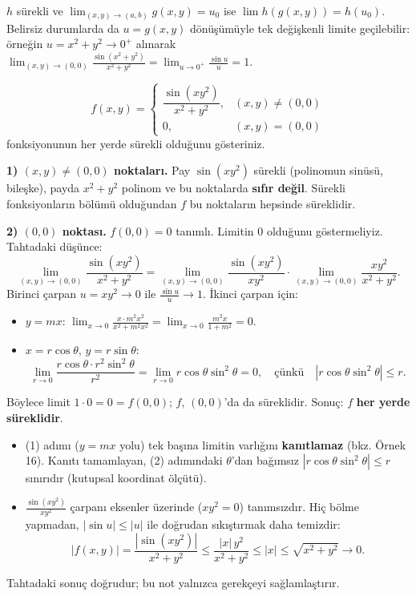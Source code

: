 \begin{bilgi}
$h$ sürekli ve $\lim_{(x,y)\to(a,b)}g(x,y)=u_0$ ise $\lim h(g(x,y))=h(u_0)$. Belirsiz durumlarda da $u=g(x,y)$
dönüşümüyle tek değişkenli limite geçilebilir: örneğin $u=x^2+y^2\to0^+$ alınarak
$\displaystyle\lim_{(x,y)\to(0,0)}\frac{\sin(x^2+y^2)}{x^2+y^2}=\lim_{u\to0^+}\frac{\sin u}{u}=1$.
\end{bilgi}

\begin{soru}
\[
f(x,y)=\begin{cases}\dfrac{\sin(xy^2)}{x^2+y^2}, & (x,y)\neq(0,0)\\[6pt] 0, & (x,y)=(0,0)\end{cases}
\]
fonksiyonunun her yerde sürekli olduğunu gösteriniz.
\end{soru}
\begin{cevap}
\textbf{1) $(x,y)\neq(0,0)$ noktaları.} Pay $\sin(xy^2)$ sürekli (polinomun sinüsü, bileşke), payda $x^2+y^2$ polinom
ve bu noktalarda \textbf{sıfır değil}. Sürekli fonksiyonların bölümü olduğundan $f$ bu noktaların hepsinde süreklidir.

\textbf{2) $(0,0)$ noktası.} $f(0,0)=0$ tanımlı. Limitin $0$ olduğunu göstermeliyiz. Tahtadaki düşünce:
\[
\lim_{(x,y)\to(0,0)}\frac{\sin(xy^2)}{x^2+y^2}=\lim_{(x,y)\to(0,0)}\frac{\sin(xy^2)}{xy^2}\cdot
\lim_{(x,y)\to(0,0)}\frac{xy^2}{x^2+y^2}.
\]
Birinci çarpan $u=xy^2\to0$ ile $\frac{\sin u}{u}\to1$. İkinci çarpan için:
\begin{itemize}
  \item[(1)] $y=mx$: $\displaystyle\lim_{x\to0}\frac{x\cdot m^2x^2}{x^2+m^2x^2}=\lim_{x\to0}\frac{m^2x}{1+m^2}=0$.
  \item[(2)] $x=r\cos\theta$, $y=r\sin\theta$:
  \[
  \lim_{r\to0}\frac{r\cos\theta\cdot r^2\sin^2\theta}{r^2}=\lim_{r\to0}r\cos\theta\sin^2\theta=0,
  \quad\text{çünkü}\quad \boxed{|r\cos\theta\sin^2\theta|\le r} .
  \]
\end{itemize}
Böylece limit $1\cdot0=0=f(0,0)$; $f$, $(0,0)$'da da süreklidir. Sonuç: $f$ \textbf{her yerde süreklidir}.
\end{cevap}

\begin{dikkat}
\begin{itemize}
  \item (1) adımı ($y=mx$ yolu) tek başına limitin varlığını \textbf{kanıtlamaz} (bkz. Örnek 16). Kanıtı
        tamamlayan, (2) adımındaki $\theta$'dan bağımsız $|r\cos\theta\sin^2\theta|\le r$ sınırıdır (kutupsal koordinat
        ölçütü).
  \item $\frac{\sin(xy^2)}{xy^2}$ çarpanı eksenler üzerinde ($xy^2=0$) tanımsızdır. Hiç bölme yapmadan, $|\sin u|\le|u|$
        ile doğrudan sıkıştırmak daha temizdir:
        \[
        |f(x,y)|=\frac{|\sin(xy^2)|}{x^2+y^2}\le\frac{|x|\,y^2}{x^2+y^2}\le|x|\le\sqrt{x^2+y^2}\to0 .
        \]
\end{itemize}
Tahtadaki sonuç doğrudur; bu not yalnızca gerekçeyi sağlamlaştırır.
\end{dikkat}

